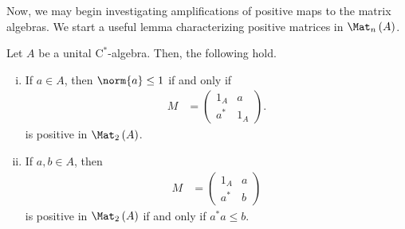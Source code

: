 Now, we may begin investigating amplifications of positive maps to the matrix algebras. We start a useful lemma characterizing positive matrices in $\Mat_n\left( A \right)$.
\begin{lemma}\label{lemma:positive_elements_from_matrix_algebras}
  Let $A$ be a unital $\mathrm{C}^{\ast}$-algebra. Then, the following hold.
  \begin{enumerate}[(i)]
    \item If $a\in A$, then $\norm{a}\leq 1$ if and only if
      \begin{align*}
        M &= \begin{pmatrix}1_A & a\\a^{\ast} & 1_A\end{pmatrix}.
      \end{align*}
      is positive in $\Mat_2\left( A \right)$.
    \item If $a,b\in A$, then 
      \begin{align*}
        M &= \begin{pmatrix}1_A & a \\ a^{\ast} & b\end{pmatrix}
      \end{align*}
      is positive in $\Mat_2\left( A \right)$ if and only if $a^{\ast}a \leq b$.
  \end{enumerate}
\end{lemma}
